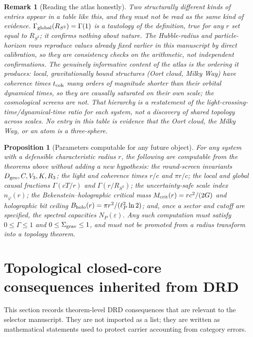 \documentclass[11pt,a4paper]{article}
\newtheorem{proposition}[theorem]{Proposition}
\newtheorem{remark}[theorem]{Remark}
\begin{document}
\begin{remark}[Reading the atlas honestly]
Two structurally different kinds of entries appear in a table like this, and they must not be read as the same kind of evidence.  $\Gamma_{\rm global}(R_{S^3})=\Gamma(1)$ is a tautology of the definition, true for any $r$ set equal to $R_{S^3}$; it confirms nothing about nature.  The Hubble-radius and particle-horizon rows reproduce values already fixed earlier in this manuscript by direct calibration, so they are consistency checks on the arithmetic, not independent confirmations.  The genuinely informative content of the atlas is the ordering it produces: local, gravitationally bound structures (Oort cloud, Milky Way) have coherence times $t_{\rm coh}$ many orders of magnitude shorter than their orbital dynamical times, so they are causally saturated on their own scale; the cosmological screens are not.  That hierarchy is a restatement of the light-crossing-time/dynamical-time ratio for each system, not a discovery of shared topology across scales.  No entry in this table is evidence that the Oort cloud, the Milky Way, or an atom is a three-sphere.
\end{remark}

\begin{proposition}[Parameters computable for any future object]
For any system with a defensible characteristic radius $r$, the following are computable from the theorems above without adding a new hypothesis: the round-screen invariants $D_{\rm geo},C,V_3,K,R_3$; the light and coherence times $r/c$ and $\pi r/c$; the local and global causal fractions $\Gamma(cT/r)$ and $\Gamma(r/R_{S^3})$; the uncertainty-safe scale index $n_\varphi(r)$; the Bekenstein--holographic critical mass $M_{\rm crit}(r)=rc^2/(2G)$ and holographic bit ceiling $B_{\rm holo}(r)=\pi r^2/(\ell_P^2\ln2)$; and, once a sector and cutoff are specified, the spectral capacities $N_P(\varepsilon)$.  Any such computation must satisfy $0\le\Gamma\le1$ and $0\le\Sigma_{\rm grav}\le1$, and must not be promoted from a radius transform into a topology theorem.
\end{proposition}

\section{Topological closed-core consequences inherited from DRD}

This section records theorem-level DRD consequences that are relevant to the selector manuscript.  They are not imported as a list; they are written as mathematical statements used to protect carrier accounting from category errors.
\end{document}

